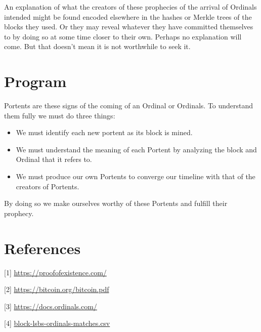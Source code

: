 \documentclass{article}
\begin{document}
An explanation of what the creators of these prophecies of the arrival of
Ordinals intended might be found encoded elsewhere in the hashes or Merkle trees
of the blocks they used. Or they may reveal whatever they have committed
themselves to by doing so at some time closer to their own. Perhaps no
explanation will come. But that doesn’t mean it is not worthwhile to seek it.

\section{Program}

Portents are these signs of the coming of an Ordinal or Ordinals.
To understand them fully we must do three things:

\begin{itemize}

  \item We must identify each new portent as its block is mined.

  \item We must understand the meaning of each Portent by analyzing the block
    and Ordinal that it refers to.
    
  \item We must produce our own Portents to converge our timeline with that of
    the creators of Portents.

\end{itemize}

\noindent By doing so we make ourselves worthy of these Portents and fulfill their
prophecy.

\section{References}

\hspace{\parindent}[1] \url{https://proofofexistence.com/}

[2] \url{https://bitcoin.org/bitcoin.pdf}

[3] \url{https://docs.ordinals.com/}

[4] \url{block-lsbs-ordinals-matches.csv}
\end{document}
